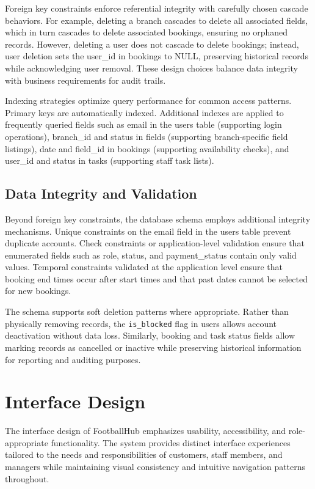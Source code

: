 Foreign key constraints enforce referential integrity with carefully chosen cascade behaviors. For example, deleting a branch cascades to delete all associated fields, which in turn cascades to delete associated bookings, ensuring no orphaned records. However, deleting a user does not cascade to delete bookings; instead, user deletion sets the user\_id in bookings to NULL, preserving historical records while acknowledging user removal. These design choices balance data integrity with business requirements for audit trails.

Indexing strategies optimize query performance for common access patterns. Primary keys are automatically indexed. Additional indexes are applied to frequently queried fields such as email in the users table (supporting login operations), branch\_id and status in fields (supporting branch-specific field listings), date and field\_id in bookings (supporting availability checks), and user\_id and status in tasks (supporting staff task lists).

\subsection{Data Integrity and Validation}

Beyond foreign key constraints, the database schema employs additional integrity mechanisms. Unique constraints on the email field in the users table prevent duplicate accounts. Check constraints or application-level validation ensure that enumerated fields such as role, status, and payment\_status contain only valid values. Temporal constraints validated at the application level ensure that booking end times occur after start times and that past dates cannot be selected for new bookings.

The schema supports soft deletion patterns where appropriate. Rather than physically removing records, the \texttt{is\_blocked} flag in users allows account deactivation without data loss. Similarly, booking and task status fields allow marking records as cancelled or inactive while preserving historical information for reporting and auditing purposes.

\section{Interface Design}

The interface design of FootballHub emphasizes usability, accessibility, and role-appropriate functionality. The system provides distinct interface experiences tailored to the needs and responsibilities of customers, staff members, and managers while maintaining visual consistency and intuitive navigation patterns throughout.

